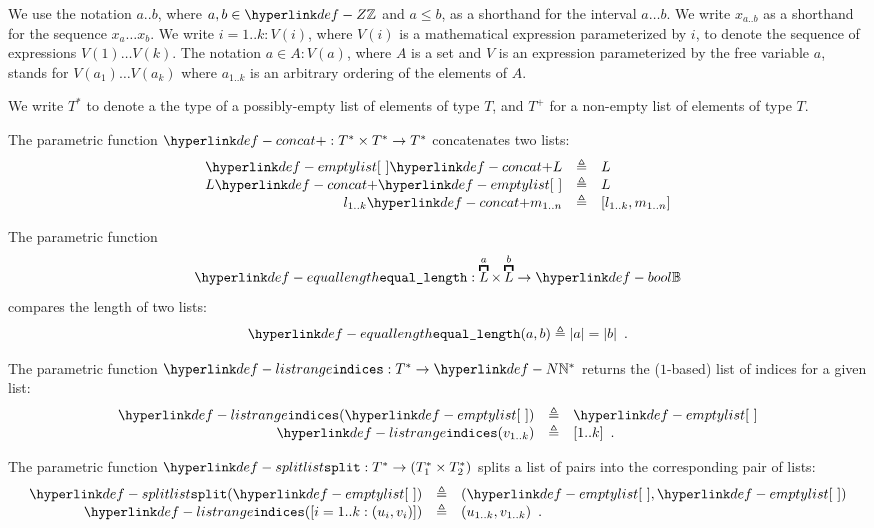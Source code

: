 We use the notation $a..b$, where $a,b\in\Z$ and $a\leq b$, as a shorthand for the interval $a\ldots b$.
We write $x_{a..b}$ as a shorthand for the sequence $x_a \ldots x_b$.
%
We write $i=1..k: V(i)$, where $V(i)$ is a mathematical expression parameterized by $i$,
to denote the sequence of expressions $V(1) \ldots V(k)$.
The notation $a \in A: V(a)$, where $A$ is a set and $V$ is an expression parameterized by the free variable $a$,
stands for $V(a_1) \ldots V(a_k)$ where $a_{1..k}$ is an arbitrary ordering of the elements of $A$.

We write $T^*$ to denote a the type of a possibly-empty list of elements of type $T$,
and $T^+$ for a non-empty list of elements of type $T$.

\hypertarget{def-concat}{}
\begin{definition}
The parametric function $\concat : T^* \times T^* \rightarrow T^*$ concatenates two lists:
\[
    \begin{array}{rcl}
    \emptylist \concat L &\triangleq& L\\
    L \concat \emptylist &\triangleq& L\\
    l_{1..k} \concat m_{1..n} &\triangleq& [l_{1..k}, m_{1..n}]
    \end{array}
\]
\end{definition}

\hypertarget{def-equallength}{}
\begin{definition}
The parametric function
\[
  \equallength : \overname{L}{a} \times \overname{L}{b} \rightarrow \Bool
\]
compares the length of two lists:
\[
\equallength(a, b) \triangleq |a|=|b| \enspace.
\]
\end{definition}

\hypertarget{def-listrange}{}
\begin{definition}
The parametric function $\listrange : T^* \rightarrow \N^*$ returns the ($1$-based) list of indices for a given list:
\[
    \begin{array}{rcl}
        \listrange(\emptylist) &\triangleq& \emptylist\\
        \listrange(v_{1..k}) &\triangleq& [1..k] \enspace.
    \end{array}
\]
\end{definition}

\hypertarget{def-splitlist}{}
\begin{definition}
The parametric function $\splitlist : T^* \rightarrow (T_1^* \times T_2^*)$
splits a list of pairs into the corresponding pair of lists:
\[
    \begin{array}{rcl}
        \splitlist(\emptylist) &\triangleq& (\emptylist, \emptylist)\\
        \listrange([i=1..k: (u_i,v_i)]) &\triangleq& (u_{1..k}, v_{1..k}) \enspace.
    \end{array}
\]
\end{definition}

